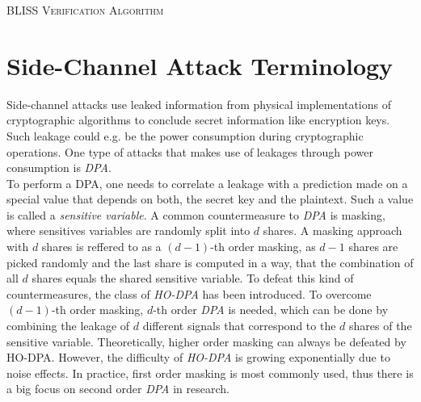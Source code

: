 \begin{algorithm}
    \caption{\textsc{BLISS Verification Algorithm}}
    \begin{algorithmic}[1]
    	\EndIf
    	\EndIf
    \end{algorithmic}
\end{algorithm}

\section{Side-Channel Attack Terminology}
Side-channel attacks use leaked information from physical implementations of cryptographic algorithms to conclude secret information like encryption keys. Such leakage could e.g. be the power consumption during cryptographic operations. One type of attacks that makes use of leakages through power consumption is \textit{\ac{DPA}}.\\
To perform a DPA, one needs to correlate a leakage with a prediction made on a special value that depends on both, the secret key and the plaintext. Such a value is called a \textit{sensitive variable}. A common countermeasure to \textit{\ac{DPA}} is masking, where sensitives variables are randomly split into \(d\) shares. A masking approach with \(d\) shares is reffered to as a \((d-1)\)-th order masking, as \(d-1\) shares are picked randomly and the last share is computed in a way, that the combination of all \(d\) shares equals the shared sensitive variable. To defeat this kind of countermeasures, the class of \textit{\ac{HO-DPA}} has been introduced. To overcome \((d-1)\)-th order masking, \(d\)-th order \textit{\ac{DPA}} is needed, which can be done by combining the leakage of \(d\) different signals that correspond to the \(d\) shares of the sensitive variable. Theoretically, higher order masking can always be defeated by HO-DPA. However, the difficulty of \textit{\ac{HO-DPA}} is growing exponentially due to noise effects. In practice, first order masking is most commonly used, thus there is a big focus on second order \textit{\ac{DPA}} in research.